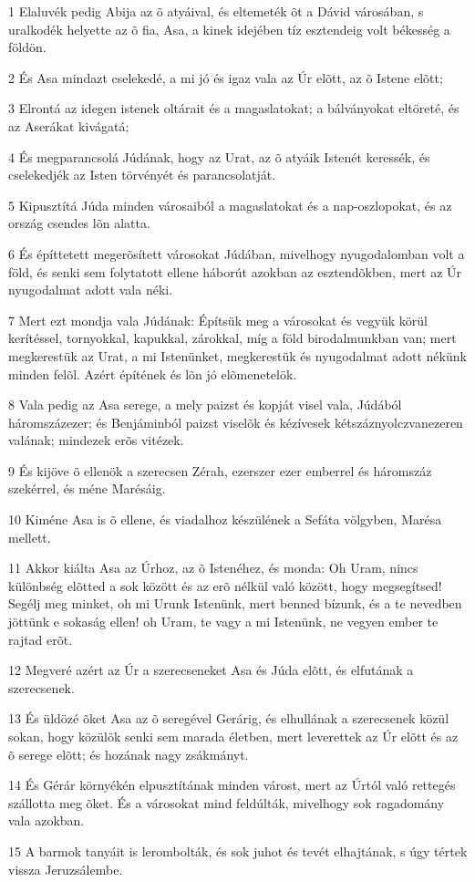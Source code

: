 \par 1 Elaluvék pedig Abija az õ atyáival, és eltemeték õt a Dávid városában, s uralkodék helyette az õ fia, Asa, a kinek idejében tíz esztendeig volt békesség a földön.
\par 2 És Asa mindazt cselekedé, a mi jó és igaz vala az Úr elõtt, az õ Istene elõtt;
\par 3 Elrontá az idegen istenek oltárait és a magaslatokat; a bálványokat eltöreté, és az Aserákat kivágatá;
\par 4 És megparancsolá Júdának, hogy az Urat, az õ atyáik Istenét keressék, és cselekedjék az Isten törvényét és parancsolatját.
\par 5 Kipusztítá Júda minden városaiból a magaslatokat és a nap-oszlopokat, és az ország csendes lõn alatta.
\par 6 És építtetett megerõsített városokat Júdában, mivelhogy nyugodalomban volt a föld, és senki sem folytatott ellene háborút azokban az esztendõkben, mert az Úr nyugodalmat adott vala néki.
\par 7 Mert ezt mondja vala Júdának: Építsük meg a városokat és vegyük körül kerítéssel, tornyokkal, kapukkal, zárokkal, míg a föld birodalmunkban van; mert megkerestük az Urat, a mi Istenünket, megkerestük és nyugodalmat adott nékünk minden felõl. Azért építének és lõn jó elõmenetelök.
\par 8 Vala pedig az Asa serege, a mely paizst és kopját visel vala, Júdából háromszázezer; és Benjáminból paizst viselõk és kézívesek kétszáznyolczvanezeren valának; mindezek erõs vitézek.
\par 9 És kijöve õ ellenök a szerecsen Zérah, ezerszer ezer emberrel és háromszáz szekérrel, és méne Marésáig.
\par 10 Kiméne Asa is õ ellene, és viadalhoz készülének a Sefáta völgyben, Marésa mellett.
\par 11 Akkor kiálta Asa az Úrhoz, az õ Istenéhez, és monda: Oh Uram, nincs különbség elõtted a sok között és az erõ nélkül való között, hogy megsegítsed! Segélj meg minket, oh mi Urunk Istenünk, mert benned bízunk, és a te nevedben jöttünk e sokaság ellen! oh Uram, te vagy a mi Istenünk, ne vegyen ember te rajtad erõt.
\par 12 Megveré azért az Úr a szerecseneket Asa és Júda elõtt, és elfutának a szerecsenek.
\par 13 És üldözé õket Asa az õ seregével Gerárig, és elhullának a szerecsenek közül sokan, hogy közülök senki sem marada életben, mert leverettek az Úr elõtt és az õ serege elõtt; és hozának nagy zsákmányt.
\par 14 És Gérár környékén elpusztítának minden várost, mert az Úrtól való rettegés szállotta meg õket. És a városokat mind feldúlták, mivelhogy sok ragadomány vala azokban.
\par 15 A barmok tanyáit is lerombolták, és sok juhot és tevét elhajtának, s úgy tértek vissza Jeruzsálembe.

